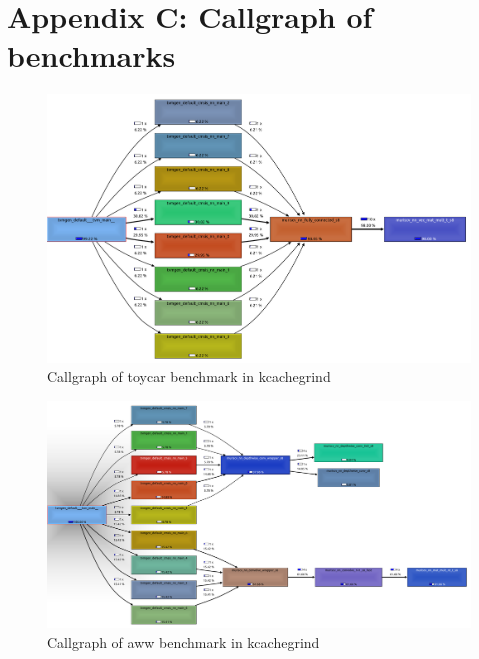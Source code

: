 \section{Appendix C: Callgraph of benchmarks}
\begin{figure}[ht]
    \centering
    \includegraphics[width=.9\linewidth]{figures/evaluation_toycar_call_graph.png}
    \caption{Callgraph of toycar benchmark in kcachegrind}
    \label{fig:evaluation_toycar_call_graph}
\end{figure}

\begin{figure}[ht]
    \includegraphics[width=\linewidth]{figures/evaluation_aww_call_graph.png}
    \caption{Callgraph of aww benchmark in kcachegrind}
    \label{fig:evaluation_aww_call_graph}
\end{figure}

